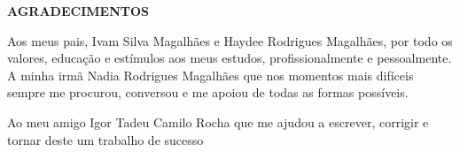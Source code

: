 \begin{center}
	\normalsize
	\textbf{AGRADECIMENTOS}
\end{center}

  Aos meus pais, Ivam Silva Magalhães e Haydee Rodrigues Magalhães, por todo os valores, educação e estímulos aos meus estudos, profissionalmente e pessoalmente. A minha irmã Nadia Rodrigues Magalhães que nos momentos mais difíceis sempre me procurou, conversou e me apoiou de todas as formas possíveis.
  
  Ao meu amigo Igor Tadeu Camilo Rocha que me ajudou a escrever, corrigir e tornar deste um trabalho de sucesso
